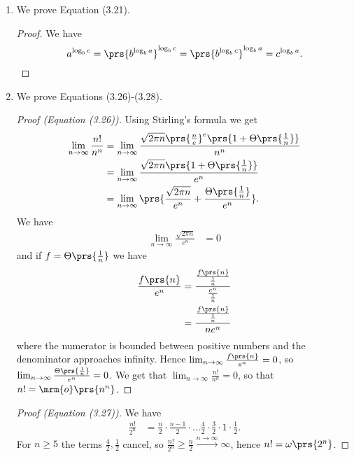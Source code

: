 \documentclass[oneside]{scrbook}
\theoremstyle{definition}
\begin{document}
\begin{exercise} \label{exercise:logarithmic-asymptotics}
    \begin{enumerate}[label = \alph*.]
        \item We prove Equation (3.21).

        \begin{proof}
            We have
            \[a^{\log_b c} = \prs{b^{\log_b a}}^{\log_b c} = \prs{b^{\log_b c}}^{\log_b a} = c^{\log_b a} \text{.}\]
        \end{proof}

        \item We prove Equations (3.26)-(3.28).

        \begin{proof}[Proof (Equation (3.26))]
            Using Stirling's formula we get
            \begin{align*}
                \lim_{n\to\infty} \frac{n!}{n^n}
                &=
                \lim_{n\to\infty} \frac{\sqrt{2 \pi n} \prs{\frac{n}{e}}^e \prs{1 + \Theta\prs{\frac{1}{n}}}}{n^n}
                \\
                &=
                \lim_{n\to\infty} \frac{\sqrt{2 \pi n} \prs{1 + \Theta\prs{\frac{1}{n}}}}{e^n}
                \\&=
                \lim_{n\to\infty} \prs{\frac{\sqrt{2 \pi n}}{e^n} + \frac{\Theta\prs{\frac{1}{n}}}{e^n}} \text{.}
            \end{align*}
            We have
            \begin{align*}
                \lim_{n\to\infty} \frac{\sqrt{2 \pi n}}{e^n} &= 0
            \end{align*}
            and if $f = \Theta\prs{\frac{1}{n}}$ we have
            \begin{align*}
                \frac{f\prs{n}}{e^n} &= \frac{\frac{f\prs{n}}{\frac{1}{n}}}{\frac{e^n}{\frac{1}{n}}}
                \\&=
                \frac{\frac{f\prs{n}}{\frac{1}{n}}}{n e^n}
            \end{align*}
            where the numerator is bounded between positive numbers and the denominator approaches infinity. Hence $\lim_{n\to\infty} \frac{f\prs{n}}{e^n} = 0$, so $\lim_{n\to\infty} \frac{\Theta\prs{\frac{1}{n}}}{e^n} = 0$.
            We get that
            $\lim_{n\to\infty} \frac{n!}{n^n} = 0$, so that $n! = \mrm{o}\prs{n^n}$.
        \end{proof}

        \begin{proof}[Proof (Equation (3.27))]
            We have
            \begin{align*}
                \frac{n!}{2^n} &= \frac{n}{2} \cdot \frac{n-1}{2} \cdot \ldots \frac{4}{2} \cdot \frac{3}{2} \cdot 1 \cdot \frac{1}{2} \text{.}
            \end{align*}
            For $n \geq 5$ the terms $\frac{4}{2}, \frac{1}{2}$ cancel, so $\frac{n!}{2^n} \geq \frac{n}{2} \xrightarrow{n\to\infty} \infty$, hence $n! = \omega\prs{2^n}$.
        \end{proof}


\end{enumerate}
\end{exercise}
\end{document}
